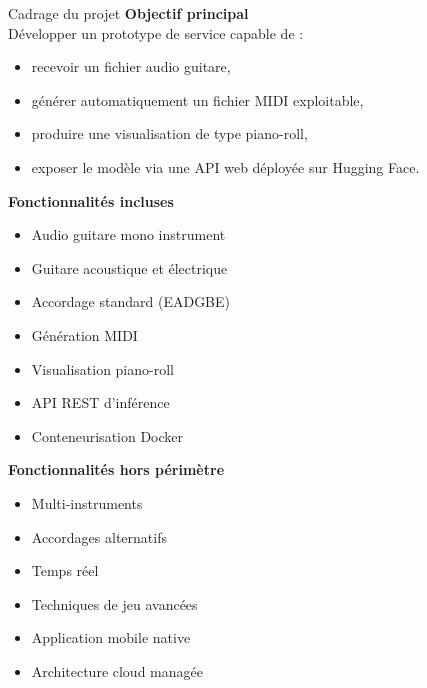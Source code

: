 \begin{frame}{Cadrage du projet}
    \textbf{Objectif principal}\\
    Développer un prototype de service capable de :
    \begin{itemize}
    	\item recevoir un fichier audio guitare,
    	\item générer automatiquement un fichier MIDI exploitable,
    	\item produire une visualisation de type piano-roll,
    	\item exposer le modèle via une API web déployée sur Hugging Face.
    \end{itemize}
    
    \vspace{0.2cm}
    
    \begin{minipage}[t]{0.48\textwidth}
    	\textbf{Fonctionnalités incluses}
    	\begin{itemize}
    		\item Audio guitare mono instrument
    		\item Guitare acoustique et électrique
    		\item Accordage standard (EADGBE)
    		\item Génération MIDI
    		\item Visualisation piano-roll
    		\item API REST d’inférence
    		\item Conteneurisation Docker
    	\end{itemize}
    \end{minipage}
    \hfill
    \begin{minipage}[t]{0.48\textwidth}
    	\textbf{Fonctionnalités hors périmètre}
    	\begin{itemize}
    		\item Multi-instruments
    		\item Accordages alternatifs
    		\item Temps réel
    		\item Techniques de jeu avancées
    		\item Application mobile native
    		\item Architecture cloud managée
    	\end{itemize}
    \end{minipage}
\end{frame}

